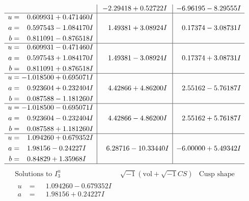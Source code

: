 \documentclass[1p]{elsarticle_modified}
\theoremstyle{definition}
\newcommand{\I}{\sqrt{-1}}
\begin{document}
$$\begin{array}{c|c|c}
 & -2.29418 + 0.52722 I & -6.96195 - 8.29555 I \\ \hline\begin{aligned}
u &= \phantom{-}0.609931 + 0.471460 I \\
a &= \phantom{-}0.597543 - 1.084170 I \\
b &= \phantom{-}0.811091 - 0.876518 I\end{aligned}
 & \phantom{-}1.49381 + 3.08924 I & \phantom{-}0.17374 - 3.08731 I \\ \hline\begin{aligned}
u &= \phantom{-}0.609931 - 0.471460 I \\
a &= \phantom{-}0.597543 + 1.084170 I \\
b &= \phantom{-}0.811091 + 0.876518 I\end{aligned}
 & \phantom{-}1.49381 - 3.08924 I & \phantom{-}0.17374 + 3.08731 I \\ \hline\begin{aligned}
u &= -1.018500 + 0.695071 I \\
a &= \phantom{-}0.923604 + 0.232404 I \\
b &= \phantom{-}0.087588 - 1.181260 I\end{aligned}
 & \phantom{-}4.42866 + 4.86200 I & \phantom{-}2.55162 - 5.76187 I \\ \hline\begin{aligned}
u &= -1.018500 - 0.695071 I \\
a &= \phantom{-}0.923604 - 0.232404 I \\
b &= \phantom{-}0.087588 + 1.181260 I\end{aligned}
 & \phantom{-}4.42866 - 4.86200 I & \phantom{-}2.55162 + 5.76187 I \\ \hline\begin{aligned}
u &= \phantom{-}1.094260 + 0.679352 I \\
a &= \phantom{-}1.98156 - 0.24227 I \\
b &= \phantom{-}0.84829 + 1.35968 I\end{aligned}
 & \phantom{-}6.28716 - 10.33440 I & -6.00000 + 5.49342 I\\
 \hline 
 \end{array}$$\newpage$$\begin{array}{c|c|c}  
\text{Solutions to }I^u_{3}& \I (\text{vol} + \sqrt{-1}CS) & \text{Cusp shape}\\
 \hline 
\begin{aligned}
u &= \phantom{-}1.094260 - 0.679352 I \\
a &= \phantom{-}1.98156 + 0.24227 I \\

\end{aligned}
\end{array}$$
\end{document}
